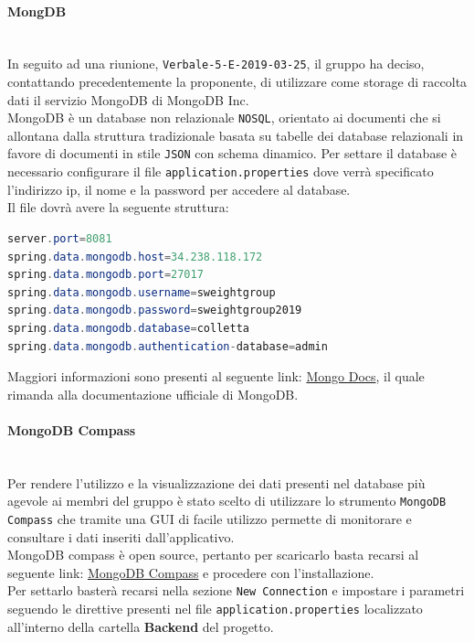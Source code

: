 \paragraph{MongDB}\mbox{}\\
In seguito ad una riunione, \texttt{Verbale-5-E-2019-03-25}, il gruppo ha deciso, contattando precedentemente la proponente, di utilizzare come storage di raccolta dati il servizio MongoDB di MongoDB Inc.\\
MongoDB è un database non relazionale \texttt{NOSQL}, orientato ai documenti che si allontana dalla struttura tradizionale basata su tabelle dei database relazionali in favore di documenti in stile \texttt{JSON} con schema dinamico. 
Per settare il database è necessario configurare il file \texttt{application.properties} dove verrà specificato l'indirizzo ip, il nome e la password per accedere al database.\\
Il file dovrà avere la seguente struttura: 
\begin{lstlisting}[language=Java] 
server.port=8081
spring.data.mongodb.host=34.238.118.172
spring.data.mongodb.port=27017
spring.data.mongodb.username=sweightgroup
spring.data.mongodb.password=sweightgroup2019
spring.data.mongodb.database=colletta
spring.data.mongodb.authentication-database=admin
\end{lstlisting}
Maggiori informazioni sono presenti al seguente link: \href{https://docs.mongodb.com/?_ga=2.183391522.509639120.1554133474-1194492321.1550924275}{Mongo Docs}, il quale rimanda alla documentazione ufficiale di MongoDB. 

\paragraph{MongoDB Compass}\mbox{}\\
Per rendere l'utilizzo e la visualizzazione dei dati presenti nel database più agevole ai membri del gruppo è stato scelto di utilizzare lo strumento \texttt{MongoDB Compass} che tramite una {GUI} di facile utilizzo permette di monitorare e consultare i dati inseriti dall'applicativo.\\
MongoDB compass è open source, pertanto per scaricarlo basta recarsi al seguente link: \href{https://www.mongodb.com/products/compass}{MongoDB Compass} e procedere con l'installazione.\\
Per settarlo basterà recarsi nella sezione \texttt{New  Connection} e impostare i parametri seguendo le direttive presenti nel file \texttt{application.properties} localizzato all'interno della cartella \textbf{Backend} del progetto.

